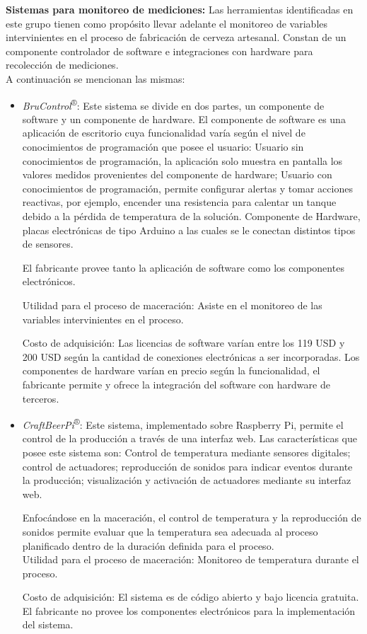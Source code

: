     \par
    \textbf{Sistemas para monitoreo de mediciones:}
    Las herramientas identificadas en este grupo tienen como propósito llevar adelante el monitoreo de variables intervinientes en el proceso de fabricación de cerveza artesanal. Constan de un componente controlador de software e integraciones con hardware para recolección de mediciones.\\
    A continuación se mencionan las mismas:\\
    \begin{itemize}
    
        \item \textit{BruControl}\textsuperscript{®}: Este sistema se divide en dos partes, un componente de software y un componente de hardware. El componente de software es una aplicación de escritorio cuya funcionalidad varía según el nivel de conocimientos de programación que posee el usuario: Usuario sin conocimientos de programación, la aplicación solo muestra en pantalla los valores medidos provenientes del componente de hardware; Usuario con conocimientos de programación, permite configurar alertas y tomar acciones reactivas, por ejemplo, encender una resistencia para calentar un tanque debido a la pérdida de temperatura de la solución. Componente de Hardware, placas electrónicas de tipo Arduino a las cuales se le conectan distintos tipos de sensores.
        \par
        El fabricante provee tanto la aplicación de software como los componentes electrónicos.
        \par
        Utilidad para el proceso de maceración: Asiste en el monitoreo de las variables intervinientes en el proceso.
        \par
        Costo de adquisición: Las licencias de software varían entre los 119 USD y 200 USD según la cantidad de conexiones electrónicas a ser incorporadas. Los componentes de hardware varían en precio según la funcionalidad, el fabricante permite y ofrece la integración del software con hardware de terceros.
        
        \item \textit{CraftBeerPi}\textsuperscript{®}: Este sistema, implementado sobre Raspberry Pi, permite el control de la producción a través de una interfaz web.
        Las características que posee este sistema son: Control de temperatura mediante sensores digitales; control de actuadores; reproducción de sonidos para indicar eventos durante la producción; visualización y activación de actuadores mediante su interfaz web.
        \par
        Enfocándose en la maceración, el control de temperatura y la reproducción de sonidos permite evaluar que la temperatura sea adecuada al proceso planificado dentro de la duración definida para el proceso.\\
        Utilidad para el proceso de maceración: Monitoreo de temperatura durante el proceso.
        \par
        Costo de adquisición: El sistema es de código abierto y bajo licencia gratuita. El fabricante no provee los componentes electrónicos para la implementación del sistema.
        

\end{itemize}
